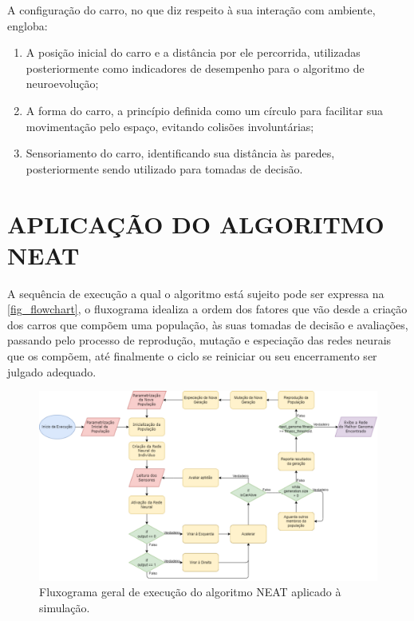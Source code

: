 A configuração do carro, no que diz respeito à sua interação
com ambiente, engloba:

\begin{enumerate}
	\item A posição inicial do carro e a distância por ele percorrida, utilizadas posteriormente como indicadores de desempenho para o algoritmo de neuroevolução;
	\item A forma do carro, a princípio definida como um círculo para facilitar sua movimentação pelo espaço, evitando colisões involuntárias;
	\item Sensoriamento do carro, identificando sua distância às paredes, posteriormente sendo utilizado para tomadas de decisão.
\end{enumerate}


\section{APLICA{\c C}{\~A}O DO ALGORITMO NEAT}
A sequência de execução a qual o algoritmo está sujeito pode ser expressa na \autoref{fig_flowchart}, o fluxograma idealiza a ordem dos fatores que vão desde a criação dos carros que compõem uma população, às suas tomadas de decisão e avaliações, passando pelo processo de reprodução, mutação e especiação das redes neurais que os compõem, até finalmente o ciclo se reiniciar ou seu encerramento ser julgado adequado.

\begin{figure}[htb]
        \centering
        \caption{\label{fig_flowchart}Fluxograma geral de execução do algoritmo NEAT aplicado à simulação.}
        \includegraphics[width=1.0\textwidth]{images/flowchart.png}
\end{figure}

